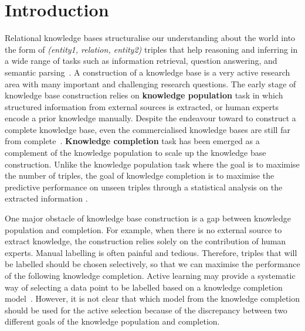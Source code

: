 
\section{Introduction}
\label{sec:intro}

Relational knowledge bases structuralise our understanding about the world into the form of \textit{(entity1, relation, entity2)} triples
that help reasoning and inferring in a wide range of tasks such as information retrieval, question answering, and semantic parsing~\cite{Dong2015,jiang2015improving,kim2013context,sondhi2014mining}.
A construction of a knowledge base is a very active research area with many important and challenging research questions.
The early stage of knowledge base construction relies on {\bf knowledge population} task
in which structured information from external sources is extracted, 
or human experts encode a prior knowledge manually.
Despite the endeavour toward to construct a complete knowledge base, 
even the commercialised knowledge bases are still far from complete~\cite{dong2014knowledge}. 
{\bf Knowledge completion} task has been emerged as a complement of the knowledge population 
to scale up the knowledge base construction. Unlike the knowledge population task where the goal is to maximise the number of triples, the goal of knowledge completion is to maximise the predictive performance on unseen triples through a statistical analysis on the extracted information \cite{guu2015traversing,Lao2010}.

One major obstacle of knowledge base construction is a gap between knowledge 
population and completion. For example, when there is no external source to extract knowledge,
the construction relies solely on the contribution of human experts.
Manual labelling is often painful and tedious. 
Therefore, triples that will be labelled should be chosen selectively, 
so that we can maximise the performance of the following knowledge completion.
Active learning may provide a systematic way of selecting a data point to be labelled based on a knowledge completion model~\cite{Settles2010}. However, it is not clear that which model from the knowledge completion should be used for the active selection because of the discrepancy between two different goals of the knowledge population and completion.

